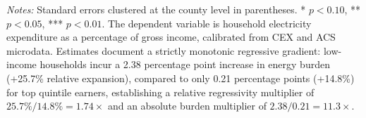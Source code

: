 \begin{table}[htbp]
\centering
\small
\caption{Distributional Incidence of the AI Grid Shock Across Household Income Quintiles}
\label{tab:table5_distribution}
\begin{minipage}{\linewidth}
\vspace{1ex}
\footnotesize \textit{Notes:} Standard errors clustered at the county level in parentheses. * $p<0.10$, ** $p<0.05$, *** $p<0.01$. The dependent variable is household electricity expenditure as a percentage of gross income, calibrated from CEX and ACS microdata. Estimates document a strictly monotonic regressive gradient: low-income households incur a 2.38 percentage point increase in energy burden (+25.7\% relative expansion), compared to only 0.21 percentage points (+14.8\%) for top quintile earners, establishing a relative regressivity multiplier of $25.7\% / 14.8\% = 1.74\times$ and an absolute burden multiplier of $2.38 / 0.21 = 11.3\times$.
\end{minipage}
\end{table}
